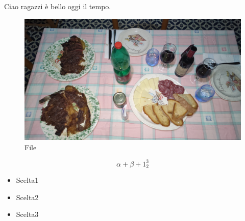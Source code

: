 \documentclass{article}
\begin{document}
Ciao ragazzi è bello oggi il tempo.
\begin{figure}
    \centering
    \includegraphics[width=0.6\linewidth]{Images/IMG20221231200758.jpg}
    \caption{File}
    \label{fig:}
\end{figure}
\begin{equation}
\alpha + \beta + 1_2^3
\end{equation}
\begin{itemize}
\item{Scelta1}
\item{Scelta2}
\item{Scelta3}
\end{itemize}
\end{document}
